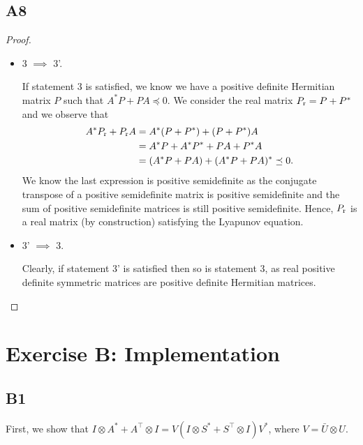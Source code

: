 \documentclass[11pt]{article}
\newcommand{\kp}{\otimes}
\begin{document}
\subsection*{A8}
\begin{proof}\leavevmode
\begin{itemize}
	\item 3 \(\implies\) 3'.
	
	If statement 3 is satisfied, we know we have a positive definite Hermitian matrix $P$ such that $A^*P+PA \preceq 0$. We consider the real matrix $P_\textnormal{r}=P+P^*$ and we observe that
	\begin{align*}
	A^* P_\textnormal{r}+P_\textnormal{r} A &= A^*(P+P^*)+(P+P^*)A\\
	&= A^*P+A^*P^*+PA+P^*A\\
	&= (A^*P+PA)+(A^*P+PA)^* \preceq 0.
	\end{align*}
	We know the last expression is positive semidefinite as the conjugate transpose of a positive semidefinite matrix is positive semidefinite and the sum of positive semidefinite matrices is still positive semidefinite. Hence, $P_\textnormal{r}$ is a real matrix (by construction) satisfying the Lyapunov equation.
	\item 3' \(\implies\) 3.
	
	Clearly, if statement 3' is satisfied then so is statement 3, as real positive definite symmetric matrices are positive definite Hermitian matrices.
\end{itemize}
\end{proof}

\section*{Exercise B: Implementation}
\subsection*{B1}
First, we show that $I \kp A^{*} + A^\top \kp I = V (I \kp S^{*} + S^\top \kp I) V^{*}$, where \(V = \bar{U} \kp U\).
\end{document}
